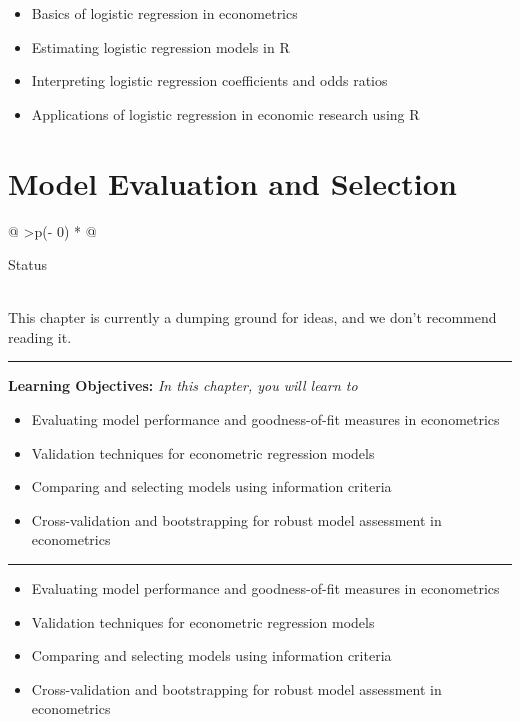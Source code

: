 \documentclass[
  letterpaper,
  paper =a4,
  twoside,
  openright,
  headsepline,
  footsepline,
  listof = totocnumbered,
  chapterprefix = true,
  firstiscover,
  parskip = full*]{scrbook}
\providecommand{\abstractname}{Learning Objectives} %
\newenvironment{objectives}[1]{%
	\hrule
	\vspace{5pt}
	\small\textbf{\abstractname: } 
	\newline
	\vspace{0.1cm}
	\small\emph{#1} %
	\itshape %
}{%
	\vspace{5pt}
	\hrule
	\vspace{0.6cm}
}
\begin{document}
\begin{itemize}
\item
  Basics of logistic regression in econometrics
\item
  Estimating logistic regression models in R
\item
  Interpreting logistic regression coefficients and odds ratios
\item
  Applications of logistic regression in economic research using R
\end{itemize}


\chapter{Model Evaluation and
Selection}\label{model-evaluation-and-selection}

\begin{longtable}[]{@{}
  >{\centering\arraybackslash}p{(\columnwidth - 0\tabcolsep) * }@{}}
\toprule\noalign{}
\begin{minipage}[b]{\linewidth}\centering
Status
\end{minipage} \\
\midrule\noalign{}
\endhead
\bottomrule\noalign{}
\endlastfoot
This chapter is currently a dumping ground for ideas, and we don't
recommend reading it. \\
\end{longtable}

\begin{objectives}{In this chapter, you will learn to}
\begin{itemize}

\item{Evaluating model performance and goodness-of-fit measures in econometrics}

\item{Validation techniques for econometric regression models}

\item{Comparing and selecting models using information criteria}

\item{Cross-validation and bootstrapping for robust model assessment in econometrics}

\end{itemize}

\end{objectives}

\begin{itemize}
\item
  Evaluating model performance and goodness-of-fit measures in
  econometrics
\item
  Validation techniques for econometric regression models
\item
  Comparing and selecting models using information criteria
\item
  Cross-validation and bootstrapping for robust model assessment in
  econometrics
\end{itemize}
\end{document}
